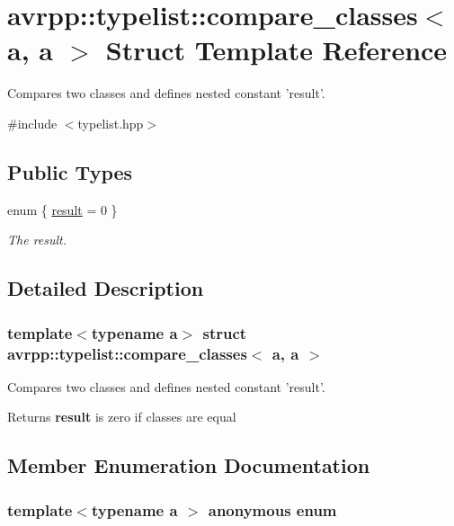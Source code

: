 \hypertarget{structavrpp_1_1typelist_1_1compare__classes_3_01a_00_01a_01_4}{
\section{avrpp::typelist::compare\_\-classes$<$ a, a $>$ Struct Template Reference}
\label{structavrpp_1_1typelist_1_1compare__classes_3_01a_00_01a_01_4}
}


Compares two classes and defines nested constant 'result'.  




{\ttfamily \#include $<$typelist.hpp$>$}

\subsection*{Public Types}
\begin{DoxyCompactItemize}
\item 
enum \{ \hyperlink{structavrpp_1_1typelist_1_1compare__classes_3_01a_00_01a_01_4_a82354acc99e9018f57f1169b526faecca3d535ecff2e468dea54860c220df0add}{result} = 0
 \}
\begin{DoxyCompactList}\small\item\em The result. \item\end{DoxyCompactList}\end{DoxyCompactItemize}


\subsection{Detailed Description}
\subsubsection*{template$<$typename a$>$ struct avrpp::typelist::compare\_\-classes$<$ a, a $>$}

Compares two classes and defines nested constant 'result'. \begin{DoxyReturn}{Returns}
{\bfseries result} is zero if classes are equal 
\end{DoxyReturn}


\subsection{Member Enumeration Documentation}
\hypertarget{structavrpp_1_1typelist_1_1compare__classes_3_01a_00_01a_01_4_a82354acc99e9018f57f1169b526faecc}{
\subsubsection[{"@29}]{\setlength{\rightskip}{0pt plus 5cm}template$<$typename a $>$ anonymous enum}}
\label{structavrpp_1_1typelist_1_1compare__classes_3_01a_00_01a_01_4_a82354acc99e9018f57f1169b526faecc}


